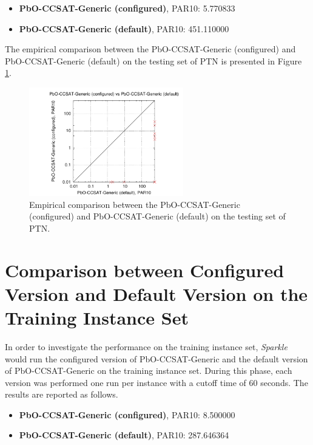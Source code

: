 \documentclass[british]{article}
\begin{document}
\begin{itemize}
\item \textbf{PbO-CCSAT-Generic (configured)}, PAR10: 5.770833
\item \textbf{PbO-CCSAT-Generic (default)}, PAR10: 451.110000
\end{itemize}

The empirical comparison between the PbO-CCSAT-Generic (configured) and PbO-CCSAT-Generic (default) on the testing set of PTN is presented in Figure \ref{fig:configured_vs_default_test}.

\begin{figure}[htbp]
\noindent \begin{centering}
\includegraphics[width=0.6\textwidth]{data_PbO-CCSAT-Generic_configured_vs_default_on_PTN_test}
\par\end{centering}

\caption{Empirical comparison between the PbO-CCSAT-Generic (configured) and PbO-CCSAT-Generic (default) on the testing set of PTN.}\label{fig:configured_vs_default_test}
\end{figure}


\section{Comparison between Configured Version and Default Version on the Training Instance Set}
In order to investigate the performance on the training instance set, \emph{Sparkle} would run the configured version of PbO-CCSAT-Generic and the default version of PbO-CCSAT-Generic on the training instance set. During this phase, each version was performed one run per instance with a cutoff time of 60 seconds. The results are reported as follows.

\begin{itemize}
\item \textbf{PbO-CCSAT-Generic (configured)}, PAR10: 8.500000
\item \textbf{PbO-CCSAT-Generic (default)}, PAR10: 287.646364
\end{itemize}
\end{document}

